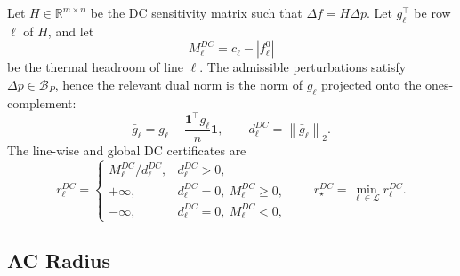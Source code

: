 \documentclass[energies,article,submit,pdftex,moreauthors]{Definitions/mdpi}
\newcommand{\R}{\mathbb{R}}
\newcommand{\ones}{\mathbf{1}}
\newcommand{\norm}[1]{\left\lVert #1 \right\rVert}
\newcommand{\abs}[1]{\left\lvert #1 \right\rvert}
\begin{document}
Let $H\in\R^{m\times n}$ be the DC sensitivity matrix such that $\Delta f=H\Delta p$. Let $g_\ell^\top$ be row $\ell$ of $H$, and let
\begin{equation}
  M_\ell^{DC}=c_\ell-\abs{f^0_\ell}
\end{equation}
be the thermal headroom of line $\ell$. The admissible perturbations satisfy $\Delta p\in\mathcal{B}_P$, hence the relevant dual norm is the norm of $g_\ell$ projected onto the ones-complement:
\begin{equation}
  \bar g_\ell
  =
  g_\ell - \frac{\ones^\top g_\ell}{n}\ones,
  \qquad
  d_\ell^{DC} = \norm{\bar g_\ell}_2.
\end{equation}
The line-wise and global DC certificates are
\begin{equation}
  r_\ell^{DC} =
  \begin{cases}
    M_\ell^{DC}/d_\ell^{DC}, & d_\ell^{DC}>0,\\
    +\infty, & d_\ell^{DC}=0,\ M_\ell^{DC}\ge 0,\\
    -\infty, & d_\ell^{DC}=0,\ M_\ell^{DC}<0,
  \end{cases}
  \qquad
  r_\star^{DC}=\min_{\ell\in\mathcal{L}}r_\ell^{DC}.
\end{equation}

\subsection{AC Radius}
\end{document}
